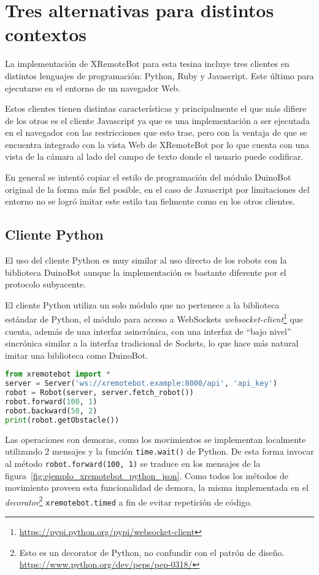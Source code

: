\chapter{Tres alternativas para distintos contextos}\label{cha:clientes}

La implementación de XRemoteBot para esta tesina incluye tres clientes en distintos
lenguajes de programación: Python, Ruby y Javascript. Este último para ejecutarse
en el entorno de un navegador Web.

Estos clientes tienen distintas características y principalmente el que más difiere
de los otros es el cliente Javascript ya que es una implementación a ser ejecutada
en el navegador con las restricciones que esto trae, pero con la ventaja de que
se encuentra integrado con la vista Web de XRemoteBot por lo que cuenta con una
vista de la cámara al lado del campo de texto donde el usuario puede codificar.

En general se intentó copiar el estilo de programación del módulo DuinoBot original
de la forma más fiel posible, en el caso de Javascript por limitaciones del entorno
no se logró imitar este estilo tan fielmente como en los otros clientes.

\section{Cliente Python}\label{sec:python}
El uso del cliente Python es muy similar al uso directo de los robots con la
biblioteca DuinoBot aunque la implementación es bastante diferente por el protocolo
subyacente.

El cliente Python utiliza un solo módulo que no pertenece a la biblioteca estándar
de Python, el módulo para acceso a WebSockets
\textit{websocket-client}\footnote{\url{https://pypi.python.org/pypi/websocket-client}}
que cuenta, además de una interfaz asincrónica, con una interfaz de ``bajo nivel''
sincrónica similar a la interfaz tradicional de Sockets, lo que hace más
natural imitar una biblioteca como DuinoBot.

\begin{lstlisting}[language=Python,
caption={Ejemplo con XRemoteBot para Python},label=lst:ejemplo_xremotebot_python]
from xremotebot import *
server = Server('ws://xremotebot.example:8000/api', 'api_key')
robot = Robot(server, server.fetch_robot())
robot.forward(100, 1)
robot.backward(50, 2)
print(robot.getObstacle())
\end{lstlisting}


Las operaciones con demoras, como los movimientos se implementan localmente
utilizando 2 mensajes y la función \texttt{time.wait()} de Python. De esta
forma
invocar al método \texttt{robot.forward(100, 1)} se traduce en los mensajes
de
la figura~\ref{fig:ejemplo_xremotebot_python_json}. Como todos los métodos
de movimiento
proveen esta funcionalidad de demora, la misma implementada en el
\textit{decorator}\footnote{Esto es un decorator de Python, no confundir
con el patrón de diseño. \url{https://www.python.org/dev/peps/pep-0318/}}
\texttt{xremotebot.timed} a fin de evitar repetición de código.

